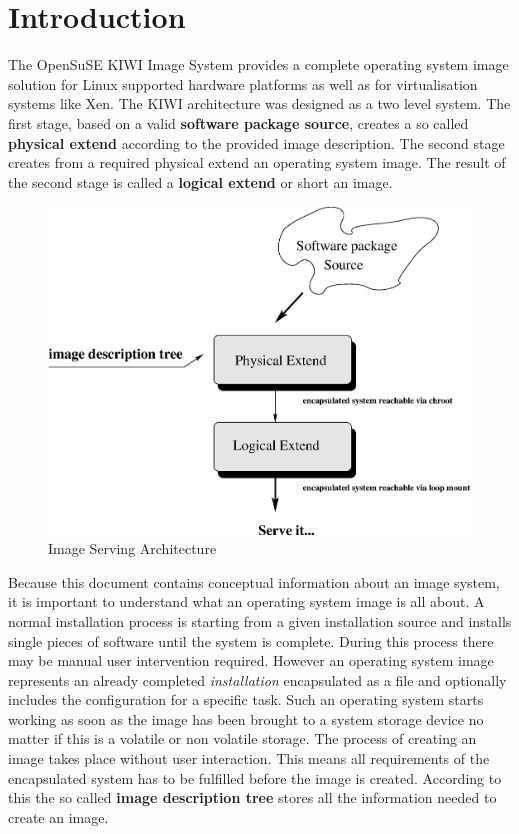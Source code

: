 \chapter{Introduction}

The OpenSuSE KIWI Image System provides a complete operating system
image solution for Linux supported hardware platforms as well as
for virtualisation systems like Xen. The KIWI architecture was designed
as a two level system. The first stage, based on a valid
\textbf{software package source}, creates a so called \textbf{physical extend}
according to the provided image description. The second stage creates from
a required physical extend an operating system image. The result of the
second stage is called a \textbf{logical extend} or short an image.

\begin{figure}[h]
\centering
\includegraphics[scale=0.5]{pictures/intro.eps}
\caption{Image Serving Architecture}
\label{fig:architecture}
\end{figure}

Because this document contains conceptual information about an image system,
it is important to understand what an operating system image is all about.
A normal installation process is starting from a given installation source
and installs single pieces of software until the system is complete. During
this process there may be manual user intervention required. However an
operating system image represents an already completed \textit{installation}
encapsulated as a file and optionally includes the configuration for a
specific task. Such an operating system starts working as soon as the
image has been brought to a system storage device no matter if this is a
volatile or non volatile storage. The process of creating an image takes
place without user interaction.
This means all requirements of the encapsulated system has to be fulfilled
before the image is created. According to this the so called
\textbf{image description tree} stores all the information needed to
create an image.

